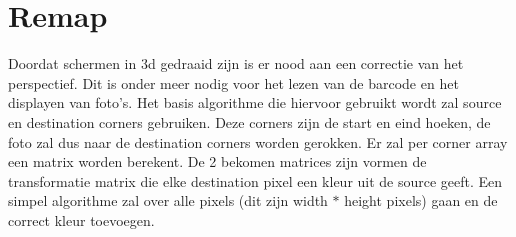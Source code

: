 \section{Remap}
Doordat schermen in 3d gedraaid zijn is er nood aan een correctie van het perspectief. Dit is onder meer nodig voor het lezen van de barcode en het displayen van foto's. Het basis algorithme die hiervoor gebruikt wordt zal source en destination corners gebruiken. Deze corners zijn de start en eind hoeken, de foto zal dus naar de destination corners worden gerokken. Er zal per corner array een matrix worden berekent. De 2 bekomen matrices zijn vormen de transformatie matrix die elke destination pixel een kleur uit de source geeft.\cite{map} Een simpel algorithme zal over alle pixels (dit zijn width $ * $ height pixels) gaan en de correct kleur toevoegen.



